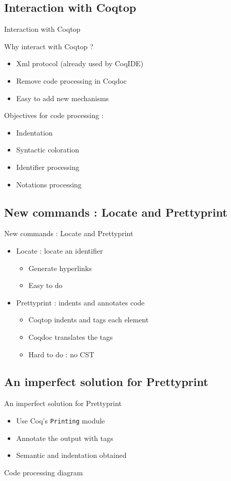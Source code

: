 \documentclass[compress]{beamer}
\newenvironment{tframe}[1]{
  \subsection{#1}
  \begin{frame}{#1}
  }{
  \end{frame}
  }
\begin{document}
  \begin{tframe}{Interaction with Coqtop}
    Why interact with Coqtop ?
    \begin{itemize}[<+->]
      \item Xml protocol (already used by CoqIDE)
      \item Remove code processing in Coqdoc
      \item Easy to add new mechanisms
    \end{itemize}
    \vfill
    Objectives for code processing :
    \begin{itemize}
      \item Indentation
      \item Syntactic coloration
      \item Identifier processing
      \item Notations processing %
    \end{itemize}
  \end{tframe}

  \begin{tframe}{New commands : Locate and Prettyprint}
    \begin{itemize}
      \item Locate : locate an identifier
        \begin{itemize}
          \item Generate hyperlinks
          \item Easy to do
        \end{itemize}
        \vfill
      \item Prettyprint : indents and annotates code
        \begin{itemize}
          \item Coqtop indents and tags each element
          \item Coqdoc translates the tags
          \item Hard to do : no CST
        \end{itemize}
    \end{itemize}
  \end{tframe}

  \begin{tframe}{An imperfect solution for Prettyprint}
    \begin{itemize}
      \item Use Coq's \texttt{Printing} module
      \item Annotate the output with tags
      \item Semantic and indentation obtained
    \end{itemize}
  \end{tframe}
  \begin{frame}{Code processing diagram}
    \resizebox{\textwidth}{!}{}
  \end{frame}
\end{document}
